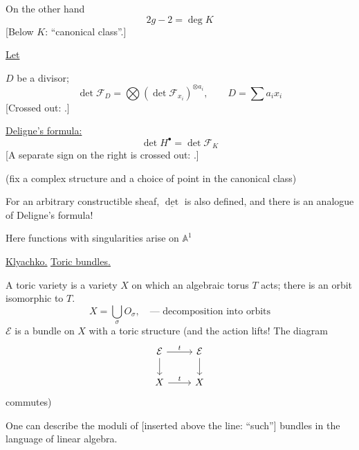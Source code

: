 On the other hand
\begin{equation*}
2g-2=\operatorname{deg}K
\end{equation*}
[Below $K$: “canonical class”.]

\underline{Let}

$D$ be a divisor;
\begin{equation*}
\det\mathcal F_D=\bigotimes(\det\mathcal F_{x_i})^{\otimes a_i},
\qquad D=\sum a_i x_i \tag{3}
\end{equation*}
[Crossed out:
.]

\underline{Deligne's formula:}
\begin{equation*}
\det H^\bullet=\det\mathcal F_K \tag{4}
\end{equation*}
[A separate sign on the right is crossed out:
.]

(fix a complex structure and a choice of point in the canonical class)

For an arbitrary constructible sheaf, $\underline{\det}$ is also defined, and
there is an analogue of Deligne's formula!

Here functions with singularities arise on $\mathbb A^1$

\underline{\underline{Klyachko.}}\quad
\underline{\underline{Toric bundles.}}

A toric variety is a variety $X$ on which an algebraic torus $T$ acts;
there is an orbit isomorphic to $T$.
\begin{equation*}
X=\bigcup_\sigma O_\sigma,\quad\text{--- decomposition into orbits}
\end{equation*}
$\mathcal E$ is a bundle on $X$ with a toric structure
(and the action lifts! The diagram
\begin{equation*}
\begin{tikzcd}
\mathcal E \arrow[r,"t"] \arrow[d] & \mathcal E \arrow[d] \\
X \arrow[r,"t"] & X
\end{tikzcd}
\end{equation*}
commutes)

One can describe the moduli of [inserted above the line: “such”]
bundles in the language of linear algebra.


